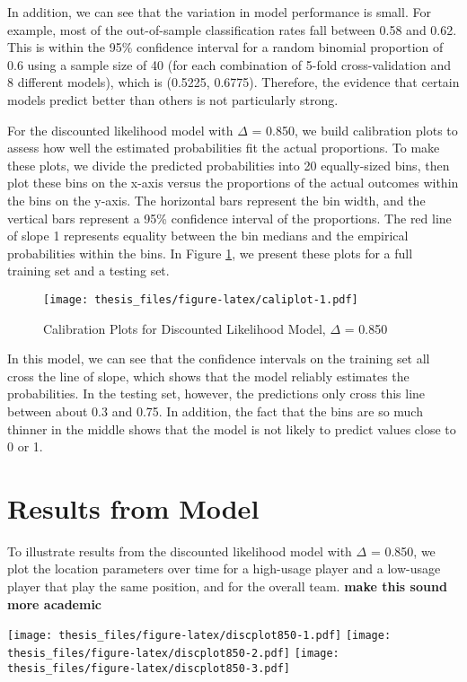 \documentclass[12pt,twoside]{dukestatscithesis}
\theoremstyle{definition}
\theoremstyle{definition}
\theoremstyle{definition}
\theoremstyle{remark}
\begin{document}
In addition, we can see that the variation in model performance is
small. For example, most of the out-of-sample classification rates fall
between 0.58 and 0.62. This is within the 95\% confidence interval for a
random binomial proportion of 0.6 using a sample size of 40 (for each
combination of 5-fold cross-validation and 8 different models), which is
(0.5225, 0.6775). Therefore, the evidence that certain models predict
better than others is not particularly strong.

For the discounted likelihood model with \(\Delta\) = 0.850, we build
calibration plots to assess how well the estimated probabilities fit the
actual proportions. To make these plots, we divide the predicted
probabilities into 20 equally-sized bins, then plot these bins on the
x-axis versus the proportions of the actual outcomes within the bins on
the y-axis. The horizontal bars represent the bin width, and the
vertical bars represent a 95\% confidence interval of the proportions.
The red line of slope 1 represents equality between the bin medians and
the empirical probabilities within the bins. In Figure
\ref{fig:caliplot}, we present these plots for a full training set and a
testing set.
\begin{figure}[htbp]
\centering
\texttt{[image: thesis\_files/figure-latex/caliplot-1.pdf]}
\caption{\label{fig:caliplot}Calibration Plots for Discounted Likelihood
Model, \(\Delta\) = 0.850}
\end{figure}
In this model, we can see that the confidence intervals on the training
set all cross the line of slope, which shows that the model reliably
estimates the probabilities. In the testing set, however, the
predictions only cross this line between about 0.3 and 0.75. In
addition, the fact that the bins are so much thinner in the middle shows
that the model is not likely to predict values close to 0 or 1.

\section{Results from Model}\label{results-from-model}

To illustrate results from the discounted likelihood model with
\(\Delta\) = 0.850, we plot the location parameters over time for a
high-usage player and a low-usage player that play the same position,
and for the overall team. \textbf{make this sound more academic}

\texttt{[image: thesis\_files/figure-latex/discplot850-1.pdf]}
\texttt{[image: thesis\_files/figure-latex/discplot850-2.pdf]}
\texttt{[image: thesis\_files/figure-latex/discplot850-3.pdf]}
\end{document}
